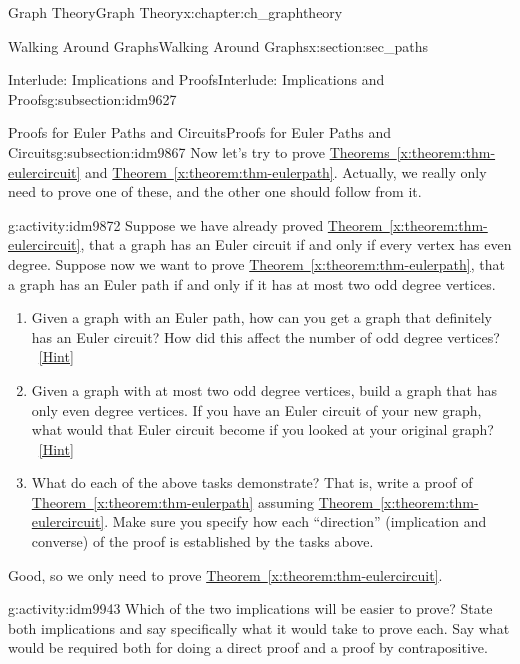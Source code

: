 \documentclass[oneside,10pt,]{book}
\numberwithin{equation}{chapter}
\begin{document}
\begin{chapterptx}{Graph Theory}{}{Graph Theory}{}{}{x:chapter:ch_graphtheory}
\begin{sectionptx}{Walking Around Graphs}{}{Walking Around Graphs}{}{}{x:section:sec_paths}
\begin{subsectionptx}{Interlude: Implications and Proofs}{}{Interlude: Implications and Proofs}{}{}{g:subsection:idm9627}
\end{subsectionptx}
%
%
\typeout{************************************************}
\typeout{************************************************}
%
\begin{subsectionptx}{Proofs for Euler Paths and Circuits}{}{Proofs for Euler Paths and Circuits}{}{}{g:subsection:idm9867}
Now let's try to prove \hyperref[x:theorem:thm-eulercircuit]{Theorems~\ref{x:theorem:thm-eulercircuit}} and \hyperref[x:theorem:thm-eulerpath]{Theorem~\ref{x:theorem:thm-eulerpath}}.  Actually, we really only need to prove one of these, and the other one should follow from it.%
\begin{activity}{}{g:activity:idm9872}%
Suppose we have already proved \hyperref[x:theorem:thm-eulercircuit]{Theorem~\ref{x:theorem:thm-eulercircuit}}, that a graph has an Euler circuit if and only if every vertex has even degree.  Suppose now we want to prove \hyperref[x:theorem:thm-eulerpath]{Theorem~\ref{x:theorem:thm-eulerpath}}, that a graph has an Euler path if and only if it has at most two odd degree vertices.%
\begin{enumerate}[font=\bfseries,label=(\alph*),ref=\alph*]
\item{}Given a graph with an Euler path, how can you get a graph that definitely has an Euler circuit?  How did this affect the number of odd degree vertices?%
\qquad~\hfill{\tiny\hyperlink{g:hint:idm9880-back}{[Hint]}}\item{}Given a graph with at most two odd degree vertices, build a graph that has only even degree vertices.  If you have an Euler circuit of your new graph, what would that Euler circuit become if you looked at your original graph?%
\qquad~\hfill{\tiny\hyperlink{g:hint:idm9904-back}{[Hint]}}\item{}What do each of the above tasks demonstrate?  That is, write a proof of \hyperref[x:theorem:thm-eulerpath]{Theorem~\ref{x:theorem:thm-eulerpath}} assuming \hyperref[x:theorem:thm-eulercircuit]{Theorem~\ref{x:theorem:thm-eulercircuit}}.  Make sure you specify how each ``direction'' (implication and converse) of the proof is established by the tasks above.%
\end{enumerate}
\end{activity}
Good, so we only need to prove \hyperref[x:theorem:thm-eulercircuit]{Theorem~\ref{x:theorem:thm-eulercircuit}}.%
\begin{activity}{}{g:activity:idm9943}%
Which of the two implications will be easier to prove?  State both implications and say specifically what it would take to prove each.  Say what would be required both for doing a direct proof and a proof by contrapositive.%

\end{activity}
\end{subsectionptx}
\end{sectionptx}
\end{chapterptx}
\end{document}
